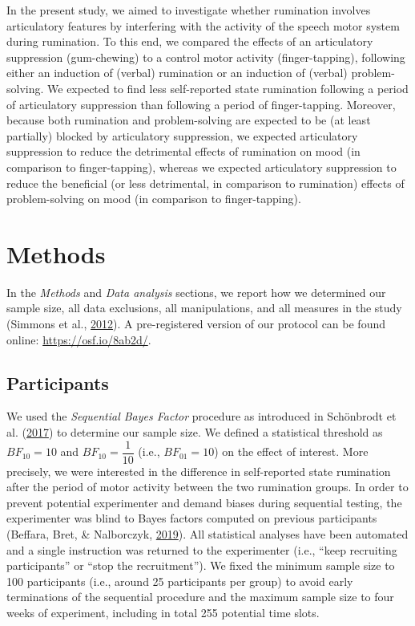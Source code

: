 \documentclass[a4paper,12pt,twoside,openright,oldfontcommands]{memoir}
\begin{document}
In the present study, we aimed to investigate whether rumination involves articulatory features by interfering with the activity of the speech motor system during rumination. To this end, we compared the effects of an articulatory suppression (gum-chewing) to a control motor activity (finger-tapping), following either an induction of (verbal) rumination or an induction of (verbal) problem-solving. We expected to find less self-reported state rumination following a period of articulatory suppression than following a period of finger-tapping. Moreover, because both rumination and problem-solving are expected to be (at least partially) blocked by articulatory suppression, we expected articulatory suppression to reduce the detrimental effects of rumination on mood (in comparison to finger-tapping), whereas we expected articulatory suppression to reduce the beneficial (or less detrimental, in comparison to rumination) effects of problem-solving on mood (in comparison to finger-tapping).

\hypertarget{methods-4}{%
\section{Methods}\label{methods-4}}

In the \emph{Methods} and \emph{Data analysis} sections, we report how we determined our sample size, all data exclusions, all manipulations, and all measures in the study (Simmons et al., \protect\hyperlink{ref-simmons_21_2012}{2012}). A pre-registered version of our protocol can be found online: \url{https://osf.io/8ab2d/}.

\hypertarget{participants-3}{%
\subsection{Participants}\label{participants-3}}

We used the \emph{Sequential Bayes Factor} procedure as introduced in Schönbrodt et al. (\protect\hyperlink{ref-schonbrodt_sequential_2017}{2017}) to determine our sample size. We defined a statistical threshold as \(BF_{10} = 10\) and \(BF_{10} = \dfrac{1}{10}\) (i.e., \(BF_{01} = 10\)) on the effect of interest. More precisely, we were interested in the difference in self-reported state rumination after the period of motor activity between the two rumination groups. In order to prevent potential experimenter and demand biases during sequential testing, the experimenter was blind to Bayes factors computed on previous participants (Beffara, Bret, \& Nalborczyk, \protect\hyperlink{ref-beffara_fully_2019}{2019}). All statistical analyses have been automated and a single instruction was returned to the experimenter (i.e., \enquote{keep recruiting participants} or \enquote{stop the recruitment}). We fixed the minimum sample size to 100 participants (i.e., around 25 participants per group) to avoid early terminations of the sequential procedure and the maximum sample size to four weeks of experiment, including in total 255 potential time slots.
\end{document}
